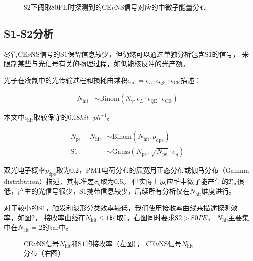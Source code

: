 \begin{figure}
    \centering
    
    \caption{\label{fig:neutrino_efficiency} $\mathrm{S2}$下阈取$80\mathrm{PE}$时探测到的CE$\nu$NS信号对应的中微子能量分布}
\end{figure}

\subsection{S1-S2分析}

尽管CE$\nu$NS信号的$\mathrm{S1}$保留信息较少，但仍然可以通过单独分析包含$\mathrm{S1}$的信号，
来限制某些与光信号有关的物理过程，如低能核反冲的光产额。

光子在液氙中的光传输过程和损耗由乘积$\epsilon_\mathrm{hit}=\epsilon_L\cdot\epsilon_\mathrm{QE}\cdot\epsilon_\mathrm{CE}$描述：

\begin{align}
    \label{eq:N_hit}
    N_\mathrm{hit} &\sim \mathrm{Binom}\left(N_\gamma,\epsilon_L\cdot\epsilon_\mathrm{QE}\cdot\epsilon_\mathrm{CE}\right)
\end{align}

本文中$\epsilon_\mathrm{hit}$取较保守的$0.08\si{hit\cdot ph^{-1}}$。

\begin{align}
    \label{eq:N_peS1}
    N_\mathrm{pe} - N_\mathrm{hit} &\sim \mathrm{Binom}\left(N_\mathrm{hit},p_\mathrm{dpe}\right) \\
    \mathrm{S1} &\sim \mathrm{Gauss}\left(N_\mathrm{pe},\sqrt{N_\mathrm{pe}}\cdot\sigma_q\right)
\end{align}

双光电子概率$p_\mathrm{dpe}$取为0.2，PMT电荷分布的展宽用正态分布或伽马分布（Gamma distribution）描述，其标准差$\sigma_q$取为0.5。
但实际上反应堆中微子能产生的$T_\mathrm{nr}$很低，产生的光信号很少，$\mathrm{S1}$携带信息较少，后续所有分析仅在$N_\mathrm{hit}$维度进行。

对于较小的$\mathrm{S1}$，触发和波形分类效率较低，我们使用接收率曲线来描述探测效率，如图\ref{fig:s1_hits_pe}，
接收率曲线在$N_\mathrm{hit}\le1$时取0。右图同时要求$\mathrm{S2}>80\si{PE}$，
$N_\mathrm{hit}$主要集中在$N_\mathrm{hit}=2$的bar中。

\begin{figure}
    \centering
    
    \caption{\label{fig:s1_hits_pe} CE$\nu$NS信号$N_\mathrm{hit}$和$\mathrm{S1}$的接收率（左图），
    CE$\nu$NS信号$N_\mathrm{hit}$分布（右图）}
\end{figure}

